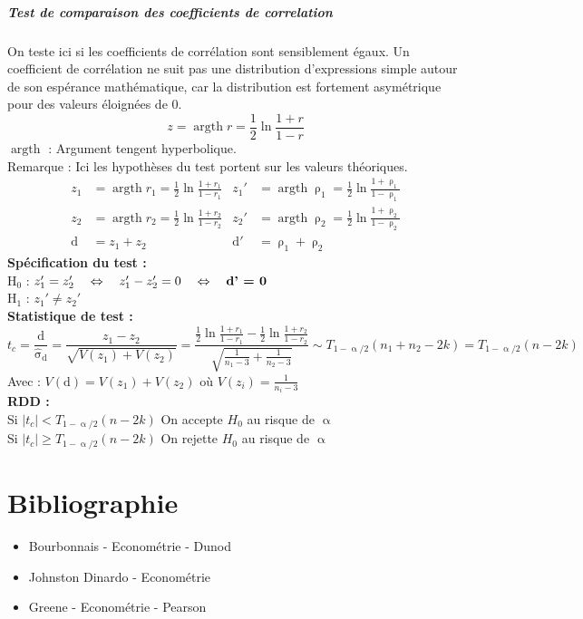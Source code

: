 \documentclass{article}
\DeclareMathOperator{\argth}{argth}
\begin{document}
\subsubsection{Test de comparaison des coefficients de correlation}
On teste ici si les coefficients de corrélation sont sensiblement égaux. Un coefficient de corrélation ne suit pas une distribution d'expressions simple autour de son espérance
mathématique, car la distribution est fortement asymétrique pour des valeurs éloignées de 0.
\begin{equation*}
		z = \argth r = \frac{1}{2} \ln \frac{1+r}{1-r}
\end{equation*}
$\argth$ : Argument tengent hyperbolique. \\
Remarque : Ici les hypothèses du test portent sur les valeurs théoriques.
\begin{align*}
		z_1 &= \argth r_1 = \frac{1}{2} \ln \frac{1+r_1}{1-r_1} & z_1' &= \argth \uprho_1 = \frac{1}{2} \ln \frac{1+\uprho_1}{1-\uprho_1} \\ 
		z_2 &= \argth r_2 = \frac{1}{2} \ln \frac{1+r_2}{1-r_2} & z_2' &= \argth \uprho_2 = \frac{1}{2} \ln \frac{1+\uprho_2}{1-\uprho_2} \\
		\text{d}&=z_1+z_2 & \text{d}'&=\uprho_1 + \uprho_2
\end{align*}
\textbf{Spécification du test :} \\
H$_0$ : $z_1' = z_2' \quad \Leftrightarrow \quad z_1' -z_2' = 0 \quad \Leftrightarrow \quad  \textbf{\text{d}' = 0}$ \\
H$_1$ :  $z_1' \neq z_2'$  \\
\textbf{Statistique de test :}
\begin{equation*}
	t_c = \frac{\text{d}}{\hat{\upsigma}_{\text{d}}} = \frac{z_1-z_2}{\sqrt{V(z_1) + V(z_2)} } = \frac{\frac{1}{2}\ln \frac{1+r_1}{1-r_1} - \frac{1}{2} \ln \frac{1+r_2}{1-r_2}}{\sqrt{\frac{1}{n_1-3}+ \frac{1}{n_2-3}} } \sim T_{1-\upalpha/2}(n_1+n_2-2k) = T_{1-\upalpha/2}(n-2k) 
\end{equation*}
Avec : $V(\text{d}) = V(z_1) + V(z_2)$ où $V(z_i) = \frac{1}{n_i-3}$ \\
\textbf{RDD : } \\
Si $ \left| t_c \right| < T_{1-\upalpha/2}(n-2k)$ On accepte $H_0$ au risque de $\upalpha$\\
Si $ \left| t_c \right| \geq T_{1-\upalpha/2}(n-2k)$ On rejette $H_0$ au risque de $\upalpha$ \\ 
\part{Bibliographie}
\begin{itemize}
    \item Bourbonnais - Econométrie - Dunod
    \item Johnston Dinardo - Econométrie
    \item Greene - Econométrie - Pearson 
\end{itemize}
\end{document}
